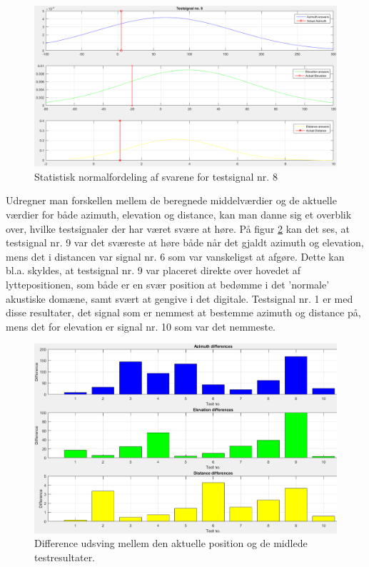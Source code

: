 \begin{figure}[h]
	\centering
	\includegraphics[width=1.1\linewidth]{All_Pics/test8stat}
	\caption{Statistisk normalfordeling af svarene for testsignal nr. 8}
	\label{fig:test8stat}
\end{figure}

Udregner man forskellen mellem de beregnede middelværdier og de aktuelle værdier for både azimuth, elevation og distance, kan man danne sig et overblik over, hvilke testsignaler der har været svære at høre. På figur \ref{fig:resoverblikdiff} kan det ses, at testsignal nr. 9 var det sværeste at høre både når det gjaldt azimuth og elevation, mens det i distancen var signal nr. 6 som var vanskeligst at afgøre. Dette kan bl.a. skyldes, at testsignal nr. 9 var placeret direkte over hovedet af lyttepositionen, som både er en svær position at bedømme i det 'normale' akustiske domæne, samt svært at gengive i det digitale. 
Testsignal nr. 1 er med disse resultater, det signal som er nemmest at bestemme azimuth og distance på, mens det for elevation er signal nr. 10 som var det nemmeste.


\begin{figure}[h]
	\centering
	\includegraphics[width=1\linewidth]{All_Pics/resoverblikdiff}
	\caption{Difference udsving mellem den aktuelle position og de midlede testresultater.}
	\label{fig:resoverblikdiff}
\end{figure}






